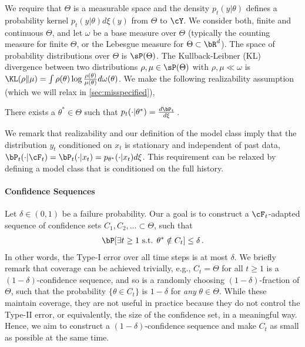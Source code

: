 We require that $\Theta$ is a measurable space and the density $p_t(y|\theta)$ defines a probability kernel $p_t(y|\theta) d \xi(y)$ from $\Theta$ to $\cY$. We consider both, finite and continuous $\Theta$, and let $\omega$ be a base measure over $\Theta$ (typically the counting measure for finite $\Theta$, or the Lebesgue measure for $\Theta \subset \bR^d$). The space of probability distributions over $\Theta$ is $\sP(\Theta)$. The Kullback-Leibner (KL) divergence between two distributions $\rho, \mu \in \sP(\Theta)$ with $\rho, \mu \ll \omega$ is $\KL(\rho\|\mu) = \int \rho(\theta) \log \frac{\rho(\theta)}{\mu(\theta)} d\omega(\theta)$. We make the following realizability assumption (which we will relax in \cref{sec:misspecified}),
\begin{assumption}[Realizability]\label{a:realizability}
There exists a $\theta^* \in \Theta$ such that $p_t(\cdot|\theta^*) = \frac{d\bP_t}{d\xi}$\,.
\end{assumption}
We remark that realizability and our definition of the model class imply that the distribution $y_t$ conditioned on $x_t$ is stationary and independent of past data, $\bP_t(\cdot|\cF_t) = \bP_t(\cdot|x_t) = p_{\theta^*}(\cdot|x_t)d\xi$. This requirement can be relaxed by defining a model class that is conditioned on the full history.

\paragraph{Confidence Sequences} Let $\delta \in (0,1)$ be a failure probability. Our a goal is to construct a $\cF_t$-adapted sequence of confidence sets $C_1, C_2, \dots \subset \Theta$, such that
\begin{align*}
\bP[\exists t \geq 1 \text{ s.t. }\theta^* \notin C_t] \leq \delta\,.
\end{align*}
In other words, the Type-I error over all time steps is at most $\delta$. We briefly remark that coverage can be achieved trivially, e.g., $C_t = \Theta$ for all $t \geq 1$ is a $(1-\delta)$-confidence sequence, and so is a randomly choosing $(1-\delta)$-fraction of $\Theta$, such that the probability $\{\theta \in C_t\}$ is $1-\delta$ for \emph{any} $\theta \in \Theta$. While these maintain coverage, they are not useful in practice because they do not control the Type-II error, or equivalently, the size of the confidence set, in a meaningful way. Hence, we aim to construct a $(1-\delta)$-confidence sequence and make $C_t$ as small as possible at the same time.

